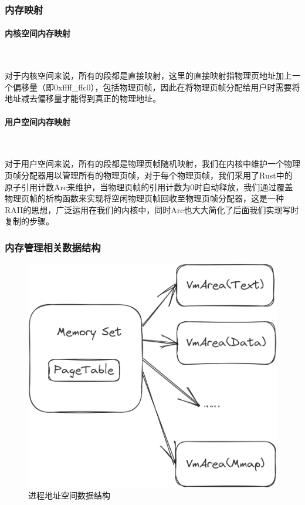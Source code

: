 \subsubsection{内存映射}

\paragraph{内核空间内存映射}~{}

对于内核空间来说，所有的段都是直接映射，这里的直接映射指物理页地址加上一个偏移量（即0xffff\_ffc0），包括物理页帧，因此在将物理页帧分配给用户时需要将地址减去偏移量才能得到真正的物理地址。

\paragraph{用户空间内存映射}~{}

对于用户空间来说，所有的段都是物理页帧随机映射，我们在内核中维护一个物理页帧分配器用以管理所有的物理页帧，对于每个物理页帧，我们采用了Rust中的原子引用计数Arc来维护，当物理页帧的引用计数为0时自动释放，我们通过覆盖物理页帧的析构函数来实现将空闲物理页帧回收至物理页帧分配器，这是一种RAII的思想，广泛运用在我们的内核中，同时Arc也大大简化了后面我们实现写时复制的步骤。

\subsubsection{内存管理相关数据结构}
\begin{figure}[hbt]
    \centering
    \includegraphics[width=.7\linewidth]{figure/mem_set.png}
    \caption{进程地址空间数据结构}
    \label{pic:mem_set}
\end{figure}


